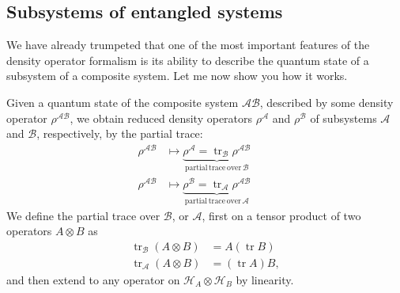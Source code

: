 \documentclass[fleqn]{article}
\begin{document}
\hypertarget{subsystems-of-entangled-systems}{%
\subsection{Subsystems of entangled systems}\label{subsystems-of-entangled-systems}}

We have already trumpeted that one of the most important features of the density operator formalism is its ability to describe the quantum state of a subsystem of a composite system.
Let me now show you how it works.

Given a quantum state of the composite system \(\mathcal{AB}\), described by some density operator \(\rho^{\mathcal{AB}}\), we obtain reduced density operators \(\rho^{\mathcal{A}}\) and \(\rho^{\mathcal{B}}\) of subsystems \(\mathcal{A}\) and \(\mathcal{B}\), respectively, by the partial trace:
\[
  \begin{aligned}
    \rho^{\mathcal{AB}}
    &\longmapsto
    \underbrace{\rho^\mathcal{A}=\operatorname{tr}_{\mathcal{B}}\rho^{\mathcal{AB}}}_{\mathrm{partial\,trace\,over}\,\mathcal{B}}\qquad
  \\\rho^{\mathcal{AB}}
    &\longmapsto
    \underbrace{\rho^\mathcal{B}=\operatorname{tr}_{\mathcal{A}}\rho^{\mathcal{AB}}}_{\mathrm{partial\,trace\,over}\,\mathcal{A}}
  \end{aligned}
\]
We define the partial trace over \(\mathcal{B}\), or \(\mathcal{A}\), first on a tensor product of two operators \(A\otimes B\) as
\[
  \begin{aligned}
    \operatorname{tr}_{\mathcal{B}} (A\otimes B)
    &= A(\operatorname{tr}B)
  \\\operatorname{tr}_{\mathcal{A}} (A\otimes B)
    &= (\operatorname{tr}A) B,
  \end{aligned}
\]
and then extend to any operator on \(\mathcal{H}_A\otimes\mathcal{H}_B\) by linearity.
\end{document}
